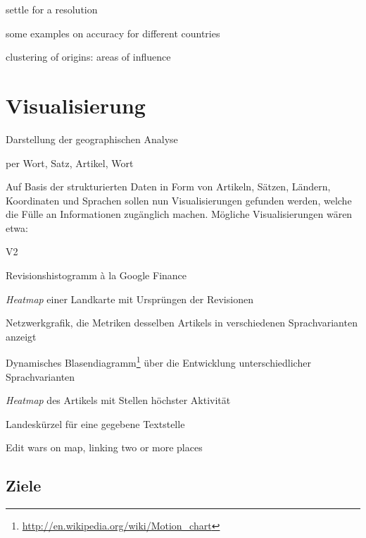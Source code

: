 \begin{todos}
    \item settle for a resolution
    \item some examples on accuracy for different countries
    \item clustering of origins: areas of influence
\end{todos}



\section{Visualisierung}

\begin{todos}
    \item Darstellung der geographischen Analyse
    \item per Wort, Satz, Artikel, Wort
\end{todos}

Auf Basis der strukturierten Daten in Form von Artikeln, Sätzen, Ländern, Koordinaten und Sprachen sollen nun Visualisierungen gefunden werden, welche die Fülle an Informationen zugänglich machen.
Mögliche Visualisierungen wären etwa:

\begin{labeling}{V2}
\item[V1] Revisionshistogramm à la Google Finance 
\item[V2] \emph{Heatmap} einer Landkarte mit Ursprüngen der Revisionen 
\item[V3] Netzwerkgrafik, die Metriken desselben Artikels in verschiedenen Sprachvarianten anzeigt
\item[V4] Dynamisches Blasendiagramm\footnote{\url{http://en.wikipedia.org/wiki/Motion_chart}} über die Entwicklung unterschiedlicher Sprachvarianten
\item[V5] \emph{Heatmap} des Artikels mit Stellen höchster Aktivität 
\item[V6] Landeskürzel für eine gegebene Textstelle
\item[V7] Edit wars on map, linking two or more places
\end{labeling}


\subsection{Ziele}

